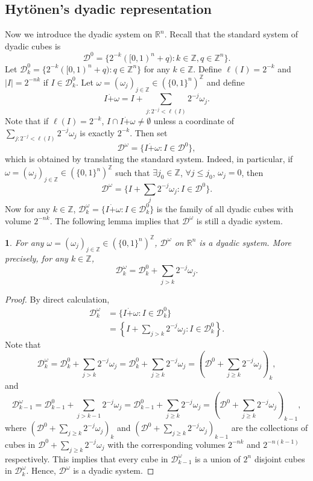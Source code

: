 \documentclass[oneside,english,a4wide]{amsart}
\numberwithin{equation}{section}
\numberwithin{figure}{section}
\theoremstyle{plain}
\theoremstyle{plain}
\theoremstyle{definition}
\theoremstyle{plain}
\newtheorem{lem}[thm]{\protect\lemmaname}
\theoremstyle{remark}
\theoremstyle{definition}
\theoremstyle{remark}
\theoremstyle{definition}
\providecommand{\lemmaname}{Lemma}
\newcommand{\8}{\infty}
\begin{document}
\subsection{Hyt\"{o}nen's dyadic representation}
Now we introduce the dyadic system on $\mathbb{R}^n$. Recall that the standard system of dyadic cubes is 
\[\mathcal{D}^0=\big\{2^{-k}([0,1)^n+q):k\in\mathbb{Z},q\in\mathbb{Z}^n\big\}.\]
Let $\mathcal{ D}^0_k=\big\{2^{-k}([0,1)^n+q):q\in\mathbb{Z}^n\big\}$ for any $k\in \mathbb{Z}$. Define $\ell(I)=2^{-k}$ and $|I|= 2^{-nk}$ if $I\in \mathcal{ D}^0_k$. Let $\omega=(\omega_j)_{j\in\mathbb{Z}}\in(\{0,1\}^n)^\mathbb{Z}$ and define
\begin{equation}\label{Idot}
	I\dot{+}\omega=I+\sum_{j:2^{-j}<\ell(I)}2^{-j}\omega_j.
\end{equation}
Note that if $\ell(I)=2^{-k}$, $I\cap I\dot{+}\omega\neq \emptyset$ unless a coordinate of $\sum_{j:2^{-j}<\ell(I)}2^{-j}\omega_j$ is exactly $2^{-k}$. Then set
\[\mathcal{D}^\omega=\big\{I\dot{+}\omega:I\in\mathcal{D}^0\big\},\]
which is obtained by translating the standard system. Indeed, in particular, if $\omega=(\omega_j)_{j\in\mathbb{Z}}\in(\{0,1\}^n)^\mathbb{Z}$ such that $\exists j_0\in \mathbb{Z}$, $\forall j\leq j_0$, $\omega_j=0$, then
$$  \mathcal{D}^\omega=\big\{I+\sum_{j}2^{-j}\omega_j:I\in\mathcal{D}^0\big\}. $$
Now for any $k\in\mathbb{Z}$, $\mathcal{ D}_k^\omega=\big\{I\dot{+}\omega:I\in\mathcal{D}_k^0\big\}$ is the family of all dyadic cubes with volume $2^{-nk}$. The following lemma implies that $\mathcal{D}^\omega$ is still a dyadic system.
\begin{lem}
	For any $\omega=(\omega_j)_{j\in\mathbb{Z}}\in(\{0,1\}^n)^\mathbb{Z}$, $\mathcal{D}^\omega$ on $\mathbb{R}^n$ is a dyadic system. More precisely, for any $k\in\mathbb{Z}$,
    \begin{equation*}
    	\mathcal{ D}_k^\omega=\mathcal{D}^0_k+\sum\limits_{j>k}2^{-j}\omega_j.
    \end{equation*}
\end{lem}
\begin{proof}
By direct calculation,
	\begin{align*}
	\mathcal{ D}_k^\omega&=\big\{I\dot{+}\omega:I\in\mathcal{D}_k^0\big\}\\
	&=\left\{I+\sum\limits_{j>k}2^{-j}\omega_j:I\in\mathcal{D}_k^0\right\}.
	\end{align*}
Note that 
$$	\mathcal{ D}_k^\omega= \mathcal{D}^0_k+\sum\limits_{j>k}2^{-j}\omega_j=\mathcal{D}^0_k+\sum\limits_{j\geq k}2^{-j}\omega_j=(\mathcal{D}^0+\sum\limits_{j\geq k}2^{-j}\omega_j)_k, $$
and
$$ \mathcal{ D}_{k-1}^\omega=\mathcal{D}^0_{k-1}+\sum\limits_{j>k-1}2^{-j}\omega_j=\mathcal{D}^0_{k-1}+\sum\limits_{j\geq k}2^{-j}\omega_j=(\mathcal{D}^0+\sum\limits_{j\geq k}2^{-j}\omega_j)_{k-1}, $$
where $(\mathcal{D}^0+\sum\limits_{j\geq k}2^{-j}\omega_j)_k$ and $(\mathcal{D}^0+\sum\limits_{j\geq k}2^{-j}\omega_j)_{k-1}$ are the collections of cubes in $\mathcal{D}^0+\sum\limits_{j\geq k}2^{-j}\omega_j$ with the corresponding volumes $2^{-nk}$ and $2^{-n(k-1)}$ respectively. This implies that every cube in $ \mathcal{ D}_{k-1}^\omega$ is a union of $2^n$ disjoint cubes in $ \mathcal{ D}_{k}^\omega$. Hence, $\mathcal{D}^\omega$ is a dyadic system.
\end{proof}
\end{document}
